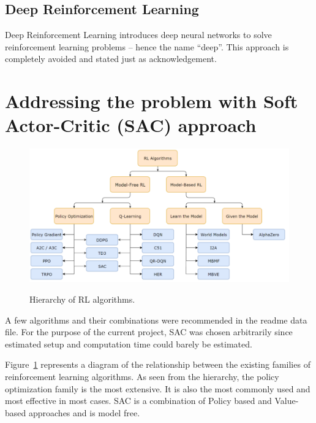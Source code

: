 \documentclass{article}
\numberwithin{equation}{subsection}
\begin{document}
\subsection{Deep Reinforcement Learning}


Deep Reinforcement Learning introduces deep neural networks to solve reinforcement learning problems – hence the name “deep”. This approach is completely avoided and stated just as acknowledgement.



\section{Addressing the problem with Soft Actor-Critic (SAC) approach}


\begin{figure}[H]
	{\centering
	  {\includegraphics[width = \textwidth]{rlHierarchy}
	  }
	  \par}
	\caption{Hierarchy of RL algorithms.}
	\label{fig:rl-hierarchy}
\end{figure}


A few algorithms and their combinations were recommended in the readme data file. For the purpose of the current project, SAC was chosen arbitrarily since estimated setup and computation time could barely be estimated. 

Figure~\ref{fig:rl-hierarchy} represents a diagram of the relationship between the existing families of reinforcement learning algorithms. As seen
from the hierarchy, the policy optimization family is the most extensive. It is also the most commonly used and most effective in most cases. SAC is a combination of Policy based and Value-based approaches and is model free. 
\end{document}
